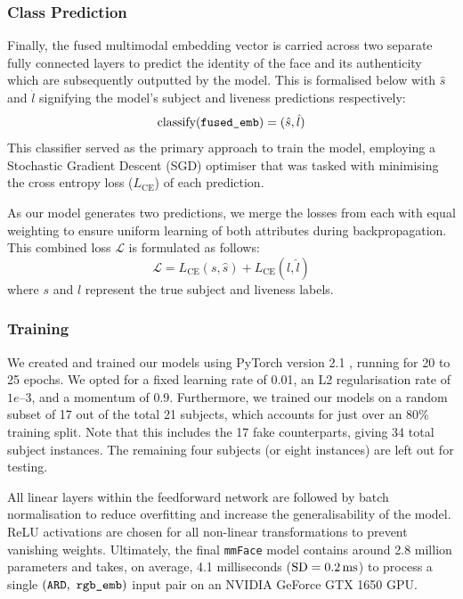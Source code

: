 \documentclass{mpaper}
\begin{document}
\subsubsection{Class Prediction}
Finally, the fused multimodal embedding vector is carried across two separate fully connected layers to predict the identity of the face and its authenticity which are subsequently outputted by the model. This is formalised below with $\hat{s}$ and $\hat{l}$ signifying the model's subject and liveness predictions respectively: 
$$\text{classify}(\verb|fused_emb|) = (\hat{s}, \hat{l})$$
This classifier served as the primary approach to train the model, employing a Stochastic Gradient Descent (SGD) optimiser that was tasked with minimising the cross entropy loss ($L_{\text{CE}}$) of each prediction. 

As our model generates two predictions, we merge the losses from each with equal weighting to ensure uniform learning of both attributes during backpropagation. This combined loss $\mathcal{L}$ is formulated as follows:
$$\mathcal{L} = L_{\text{CE}}(s, \hat{s}) + L_{\text{CE}}(l, \hat{l})$$
where $s$ and $l$ represent the true subject and liveness labels.

\vspace{0.2cm}
\subsubsection{Training}
We created and trained our models using PyTorch version 2.1 \cite{paszke2019pytorch}, running for 20 to 25 epochs. We opted for a fixed learning rate of 0.01, an L2 regularisation rate of $1e\text{--3}$, and a momentum of 0.9. Furthermore, we trained our models on a random subset of 17 out of the total 21 subjects, which accounts for just over an 80\% training split. Note that this includes the 17 fake counterparts, giving 34 total subject instances. The remaining four subjects (or eight instances) are left out for testing. 

All linear layers within the feedforward network are followed by batch normalisation to reduce overfitting and increase the generalisability of the model. ReLU activations are chosen for all non-linear transformations to prevent vanishing weights. Ultimately, the final \texttt{mmFace} model contains around 2.8 million parameters and takes, on average, 4.1 milliseconds ($\text{SD}=\text{\qty{0.2}{\ms}}$) to process a single $(\mathtt{ARD}, \  \verb|rgb_emb|)$ input pair on an NVIDIA GeForce GTX 1650 GPU.
\end{document}
